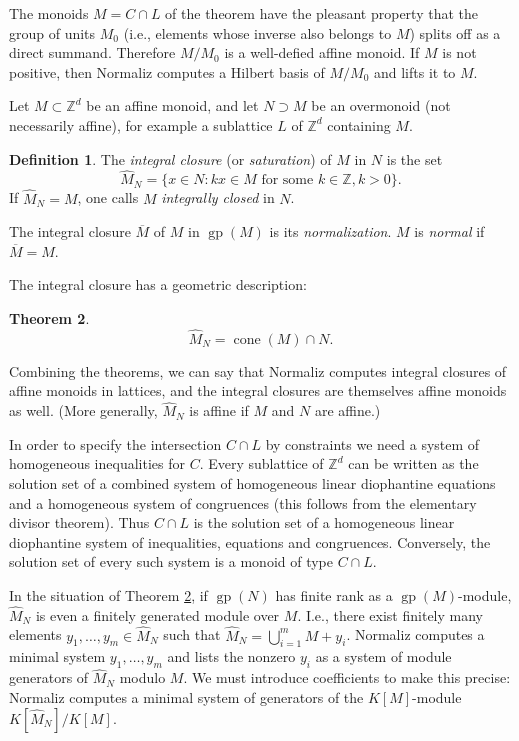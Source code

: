 \documentclass[12pt,a4paper]{scrartcl}
\newtheorem{theorem}{Theorem}
\theoremstyle{definition}
\newtheorem{definition}[theorem]{Definition}
\def\ZZ{{\mathbb Z}}
\DeclareMathOperator{\gp}{gp}
\DeclareMathOperator{\cone}{cone}
\begin{document}
The monoids $M=C\cap L$  of the theorem have the pleasant property that the group of units $M_0$ (i.e., elements whose inverse also belongs to $M$) splits off as a direct summand. Therefore $M/M_0$ is a well-defied affine monoid. If $M$ is not positive, then Normaliz computes a Hilbert basis of $M/M_0$ and lifts it to $M$. 

Let $M\subset \ZZ^d$ be an affine monoid, and let $N\supset M$ be an overmonoid (not necessarily affine), for example a sublattice $L$ of $\ZZ^d$ containing $M$.

\begin{definition}
	The \emph{integral closure} (or \emph{saturation}) of $M$ in $N$ is the set
	$$
	\widehat M_N=\{x\in N: kx\in M \text{ for some } k\in \ZZ, k>0\}.
	$$
	If $\widehat M_N=M$, one calls $M$ \emph{integrally closed} in $N$.
	
	The integral closure $\overline M$ of $M$ in $\gp(M)$ is its \emph{normalization}. $M$ is \emph{normal} if $\overline M=M$.
\end{definition}

The integral closure has a geometric description:

\begin{theorem}\label{incl_cone}
	$$
	\widehat M_N =\cone(M)\cap N.
	$$
\end{theorem}

Combining the theorems, we can say that Normaliz computes integral closures of affine monoids in lattices, and the integral closures are themselves affine monoids as well. (More generally, $\widehat M_N$ is affine if $M$ and $N$ are affine.)

In order to specify the intersection $C\cap L$ by constraints we need a system of homogeneous inequalities for $C$. Every sublattice of $\ZZ^d$ can be written as the solution set of a combined system of homogeneous linear diophantine equations and a homogeneous system of congruences (this follows from the elementary divisor theorem). Thus $C\cap L$ is the solution set of a homogeneous linear diophantine system of inequalities, equations and congruences. Conversely, the solution set of every such system is a monoid of type $C\cap L$.

In the situation of Theorem \ref{incl_cone}, if $\gp(N)$ has finite rank as a $\gp(M)$-module, $\widehat M_N$ is even a finitely generated module over $M$. I.e., there exist finitely many elements $y_1,\dots,y_m\in \widehat M_N$ such that $\widehat M_N=\bigcup_{i=1}^m M+y_i$. Normaliz computes a minimal system $y_1,\dots,y_m$ and lists the nonzero $y_i$ as a system of module generators of $\widehat M_N$ modulo $M$. We must introduce coefficients to make this precise: Normaliz computes a minimal system of generators of the $K[M]$-module $K[\widehat M_N]/K[M]$.
\end{document}
